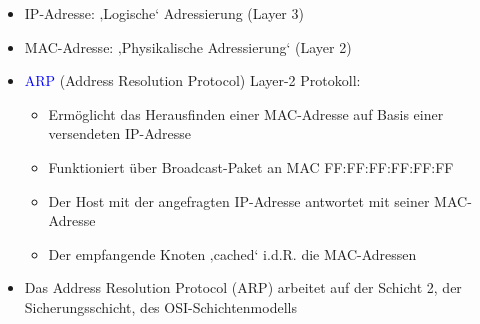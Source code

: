 
\begin{itemize}
    \item IP-Adresse: ‚Logische‘ Adressierung (Layer 3)
    \item MAC-Adresse: ‚Physikalische Adressierung‘ (Layer 2)
\end{itemize}

\begin{itemize}
    \item \textcolor{blue}{ARP} (Address Resolution Protocol) Layer-2 Protokoll:
    \begin{itemize}
        \item Ermöglicht das Herausfinden einer MAC-Adresse auf Basis einer versendeten IP-Adresse
        \item Funktioniert über Broadcast-Paket an MAC FF:FF:FF:FF:FF:FF
        \item Der Host mit der angefragten IP-Adresse antwortet mit seiner MAC-Adresse
        \item Der empfangende Knoten ‚cached‘ i.d.R. die MAC-Adressen
    \end{itemize}
\end{itemize}

\begin{itemize}
    \item Das Address Resolution Protocol (ARP) arbeitet auf der Schicht 2, der Sicherungsschicht, des OSI-Schichtenmodells
\end{itemize}

